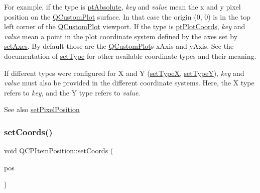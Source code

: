 For example, if the type is \mbox{\hyperlink{class_q_c_p_item_position_aad9936c22bf43e3d358552f6e86dbdc8a564f5e53e550ead1ec5fc7fc7d0b73e0}{pt\+Absolute}}, {\itshape key} and {\itshape value} mean the x and y pixel position on the \mbox{\hyperlink{class_q_custom_plot}{Q\+Custom\+Plot}} surface. In that case the origin (0, 0) is in the top left corner of the \mbox{\hyperlink{class_q_custom_plot}{Q\+Custom\+Plot}} viewport. If the type is \mbox{\hyperlink{class_q_c_p_item_position_aad9936c22bf43e3d358552f6e86dbdc8ad5ffb8dc99ad73263f7010c77342294c}{pt\+Plot\+Coords}}, {\itshape key} and {\itshape value} mean a point in the plot coordinate system defined by the axes set by \mbox{\hyperlink{class_q_c_p_item_position_a2185f45c75ac8cb9be89daeaaad50e37}{set\+Axes}}. By default those are the \mbox{\hyperlink{class_q_custom_plot}{Q\+Custom\+Plot}}\textquotesingle{}s x\+Axis and y\+Axis. See the documentation of \mbox{\hyperlink{class_q_c_p_item_position_aa476abf71ed8fa4c537457ebb1a754ad}{set\+Type}} for other available coordinate types and their meaning.

If different types were configured for X and Y (\mbox{\hyperlink{class_q_c_p_item_position_a2113b2351d6d00457fb3559a4e20c3ea}{set\+TypeX}}, \mbox{\hyperlink{class_q_c_p_item_position_ac2a454aa5a54c1615c50686601ec4510}{set\+TypeY}}), {\itshape key} and {\itshape value} must also be provided in the different coordinate systems. Here, the X type refers to {\itshape key}, and the Y type refers to {\itshape value}.

\begin{DoxySeeAlso}{See also}
\mbox{\hyperlink{class_q_c_p_item_position_a8d4f858f2089973967cf9cb81970ef0a}{set\+Pixel\+Position}} 
\end{DoxySeeAlso}
\mbox{\label{class_q_c_p_item_position_acc70b3abc143287f806e5f154e5e07b0}} 
\subsubsection{\texorpdfstring{set\+Coords()}{setCoords()}\hspace{0.1cm}{\footnotesize\ttfamily [2/2]}}
{\footnotesize\ttfamily void Q\+C\+P\+Item\+Position\+::set\+Coords (\begin{DoxyParamCaption}\item[{const Q\+PointF \&}]{pos }\end{DoxyParamCaption})}


